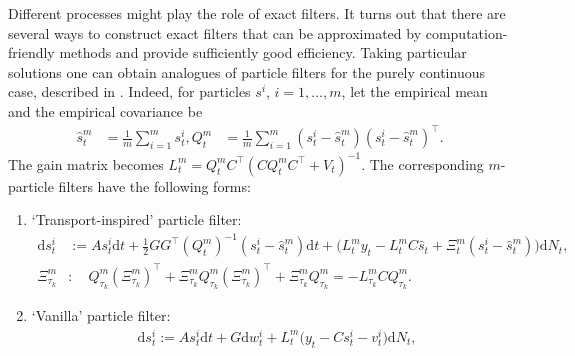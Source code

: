 \documentclass[12pt]{llncs}
\begin{document}
Different processes might play the role of exact filters. It turns out that there are several ways to construct exact filters that can be approximated by computation-friendly methods and provide sufficiently good efficiency.
Taking particular solutions %
one can obtain analogues of particle filters for the purely continuous case, described in \cite{bishop}. Indeed, for particles $s^i$, $i=1,\ldots,m$, let the empirical mean and the empirical covariance be
 \begin{align}
  \widehat s^{m}_t &= \frac{1}{m}\sum\limits_{i=1}^{m} s^i_t,
   Q^{m}_t &= \frac{1}{m}\sum\limits_{i=1}^{m} (s^i_t - \widehat s^{m}_t)(s^i_t - \widehat s^{m}_t)^\top.
 \end{align}
The gain matrix becomes $L_t^{m} = Q_t^{m} C^\top (C Q_t^{m} C^\top + V_t)^{-1}.$
The corresponding $m$-particle filters have the following forms:
\begin{enumerate}

\item `Transport-inspired' particle filter:
\begin{align}
    \mathrm{d} s^i_t &:= A s^i_t \mathrm{d} t +  \frac{1}{2}GG^\top (Q^{m}_t)^{-1} (s^i_t-\widehat s^{m}_t) \mathrm{d} t
    +  \Big(L^{m}_t y_t - L^{m}_t C \widehat s_t +\Xi^{m}_t (s^i_t - \widehat s^{m}_t) \Big) \mathrm{d} N_t,
    \label{eq:ch5: particles transport-insp}
    \\
    \Xi^{m}_{\tau_k} &: \quad Q^{m}_{\tau_k} (\Xi^{m}_{\tau_k})^\top + \Xi^{m}_{\tau_k} Q^{m}_{\tau_k} (\Xi^{m}_{\tau_k})^\top + \Xi^{m}_{\tau_k} Q^{m}_{\tau_k} = - L_{\tau_k}^{m} C Q^{m}_{\tau_k}.
    \label{eq:ch5: particles xi transport-insp}
\end{align}
\item `Vanilla' particle filter:
\begin{align}
\label{eq:ch5: particles vanilla}
&\mathrm{d} s^i_t := A s^i_t \mathrm{d} t +  G  \mathrm{d} w^i_t
    + L^{m}_t \Big(y_t - C s^i_t  - v^i_t \Big) \mathrm{d} N_t, %
\end{align}
\end{enumerate}
\end{document}
